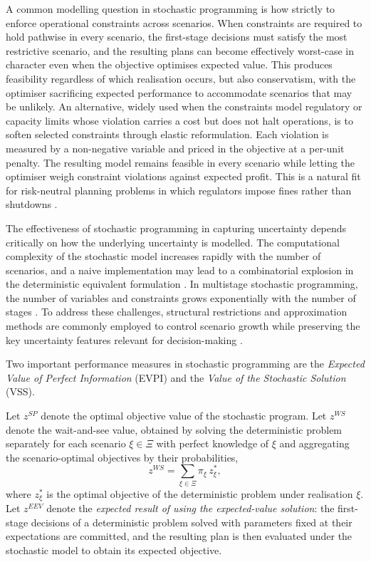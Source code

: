 \documentclass[12pt,a4paper]{article}
\begin{document}
A common modelling question in stochastic programming is how strictly to enforce operational constraints across scenarios. When constraints are required to hold pathwise in every scenario, the first-stage decisions must satisfy the most restrictive scenario, and the resulting plans can become effectively worst-case in character even when the objective optimises expected value. This produces feasibility regardless of which realisation occurs, but also conservatism, with the optimiser sacrificing expected performance to accommodate scenarios that may be unlikely. An alternative, widely used when the constraints model regulatory or capacity limits whose violation carries a cost but does not halt operations, is to soften selected constraints through elastic reformulation. Each violation is measured by a non-negative variable and priced in the objective at a per-unit penalty. The resulting model remains feasible in every scenario while letting the optimiser weigh constraint violations against expected profit. This is a natural fit for risk-neutral planning problems in which regulators impose fines rather than shutdowns \citep{birge2011introduction, king2012modeling}.
 
The effectiveness of stochastic programming in capturing uncertainty depends critically on how the underlying uncertainty is modelled. The computational complexity of the stochastic model increases rapidly with the number of scenarios, and a naive implementation may lead to a combinatorial explosion in the deterministic equivalent formulation \citep{birge2011introduction, shapiro2014lectures}. In multistage stochastic programming, the number of variables and constraints grows exponentially with the number of stages \citep{king2012modeling}. To address these challenges, structural restrictions and approximation methods are commonly employed to control scenario growth while preserving the key uncertainty features relevant for decision-making \citep{king2012modeling}.
 
Two important performance measures in stochastic programming are the
\emph{Expected Value of Perfect Information} (EVPI) and the \emph{Value of
the Stochastic Solution} (VSS).
 
Let $z^{SP}$ denote the optimal objective value of the stochastic program.
Let $z^{WS}$ denote the wait-and-see value, obtained by solving the
deterministic problem separately for each scenario $\xi \in \Xi$ with
perfect knowledge of $\xi$ and aggregating the scenario-optimal objectives
by their probabilities,
\begin{equation}
  z^{WS} = \sum_{\xi \in \Xi} \pi_\xi\, z^*_\xi,
\end{equation}
where $z^*_\xi$ is the optimal objective of the deterministic problem under
realisation $\xi$. Let $z^{EEV}$ denote the \emph{expected result of using
the expected-value solution}: the first-stage decisions of a deterministic
problem solved with parameters fixed at their expectations are committed,
and the resulting plan is then evaluated under the stochastic model to
obtain its expected objective.
 
\end{document}
